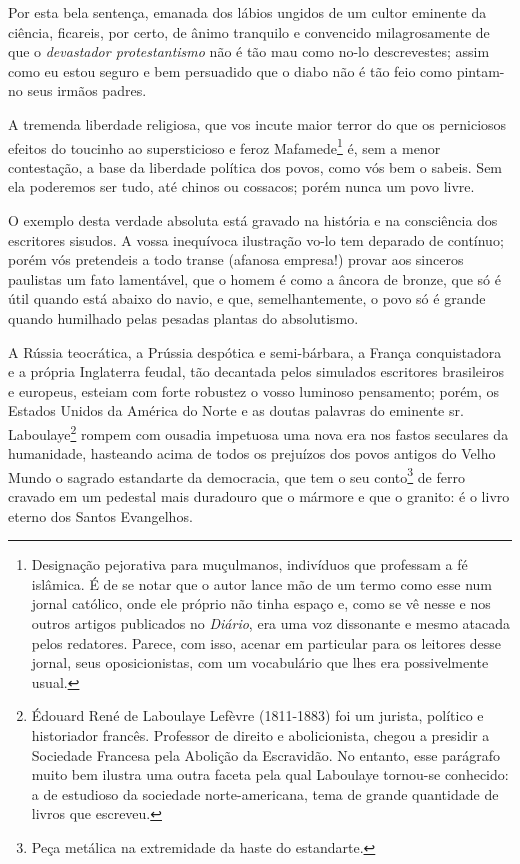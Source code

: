 Por esta bela sentença, emanada dos lábios ungidos de um cultor eminente
da ciência, ficareis, por certo, de ânimo tranquilo e convencido
milagrosamente de que o \emph{devastador protestantismo} não é tão mau
como no-lo descrevestes; assim como eu estou seguro e bem persuadido que
o diabo não é tão feio como pintam-no seus irmãos padres.

A tremenda liberdade religiosa, que vos incute maior terror do que os
perniciosos efeitos do toucinho ao supersticioso e feroz
Mafamede\footnote{Designação pejorativa para muçulmanos, indivíduos
  que professam a fé islâmica. É de se notar que o autor lance mão de um
  termo como esse num jornal católico, onde ele próprio não tinha espaço
  e, como se vê nesse e nos outros artigos publicados no \emph{Diário},
  era uma voz dissonante e mesmo atacada pelos redatores. Parece, com
  isso, acenar em particular para os leitores desse jornal, seus
  oposicionistas, com um vocabulário que lhes era possivelmente usual.}
é, sem a menor contestação, a base da liberdade política dos povos, como
vós bem o sabeis. Sem ela poderemos ser tudo, até chinos ou cossacos;
porém nunca um povo livre.

O exemplo desta verdade absoluta está gravado na história e na
consciência dos escritores sisudos. A vossa inequívoca ilustração vo-lo
tem deparado de contínuo; porém vós pretendeis a todo transe (afanosa
empresa!) provar aos sinceros paulistas um fato lamentável, que o homem
é como a âncora de bronze, que só é útil quando está abaixo do navio, e
que, semelhantemente, o povo só é grande quando humilhado pelas pesadas
plantas do absolutismo.

A Rússia teocrática, a Prússia despótica e semi-bárbara, a França
conquistadora e a própria Inglaterra feudal, tão decantada pelos
simulados escritores brasileiros e europeus, esteiam com forte robustez
o vosso luminoso pensamento; porém, os Estados Unidos da América do
Norte e as doutas palavras do eminente sr. Laboulaye\footnote{Édouard
  René de Laboulaye Lefèvre (1811-1883) foi um jurista, político e
  historiador francês. Professor de direito e abolicionista, chegou a
  presidir a Sociedade Francesa pela Abolição da Escravidão. No entanto,
  esse parágrafo muito bem ilustra uma outra faceta pela qual Laboulaye
  tornou-se conhecido: a de estudioso da sociedade norte-americana, tema
  de grande quantidade de livros que escreveu.} rompem com ousadia
impetuosa uma nova era nos fastos seculares da humanidade, hasteando
acima de todos os prejuízos dos povos antigos do Velho Mundo o sagrado
estandarte da democracia, que tem o seu conto\footnote{Peça metálica
  na extremidade da haste do estandarte.} de ferro cravado em um
pedestal mais duradouro que o mármore e que o granito: é o livro eterno
dos Santos Evangelhos.

